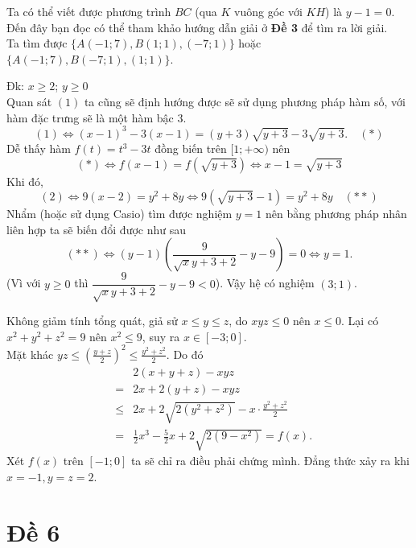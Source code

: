 \hda 
Ta có thể viết được phương trình $BC$ (qua $K$ vuông góc với $KH$) là $y-1=0$. Đến đây bạn đọc có thể tham khảo hướng dẫn giải ở \textbf{Đề 3} để tìm ra lời giải.\\
Ta tìm được $\{A(-1;7), B(1;1), (-7;1)\}$ hoặc $\{A(-1;7), B(-7;1), (1;1)\}$.

\hda 
Đk: $x\ge 2$; $y\ge 0$\\
Quan sát $(1)$ ta cũng sẽ định hướng được sẽ sử dụng phương pháp hàm số, với hàm đặc trưng sẽ là một hàm bậc 3.
$$ (1)\iff  (x-1)^3-3(x-1)=(y+3)\sqrt{y+3}-3\sqrt{y+3}.\quad (\ast) $$
Dễ thấy hàm $f(t)=t^3-3t$ đồng biến trên $[1;+\infty)$ nên
$$ (\ast)\iff  f(x-1)=f(\sqrt{y+3})\iff  x-1=\sqrt{y+3} $$
Khi đó,
$$ (2)\iff  9(x-2)=y^2+8y\iff  9(\sqrt{y+3}-1)=y^2+8y\quad (\ast\ast) $$
Nhẩm (hoặc sử dụng Casio) tìm được nghiệm $y=1$ nên bằng phương pháp nhân liên hợp ta sẽ biến đổi được như sau
$$ (\ast\ast)\iff  (y-1)\left(\dfrac{9}{\sqrt x{y+3}+2}-y-9\right)=0\iff  y=1. $$
(Vì với $y\ge 0$ thì $\dfrac{9}{\sqrt x{y+3}+2}-y-9<0$). Vậy hệ có nghiệm $(3;1)$.

\hda 
Không giảm tính tổng quát, giả sử $x\le y\le z$, do $xyz\le 0$ nên $x\le 0$. Lại có $x^2+y^2+z^2=9$ nên $x^2\le 9$, suy ra $x\in [-3;0]$.\\
Mặt khác $yz\le \left(\frac{y+z}2\right)^2\le \frac{y^2+z^2}2$. Do đó 
\begin{eqnarray*}
&&2(x+y+z)-xyz\\ 
&=& 2x+2(y+z)-xyz\\
&\le & 2x+2\sqrt{2(y^2+z^2)}-x\cdot \frac{y^2+z^2}2\\
&=&\frac 12x^3-\frac 52 x+2\sqrt{2(9-x^2)}=f(x).
\end{eqnarray*}
Xét $f(x)$ trên $[-1;0]$ ta sẽ chỉ ra điều phải chứng mình. Đẳng thức xảy ra khi $x=-1, y=z=2$.
\section{Đề 6}


